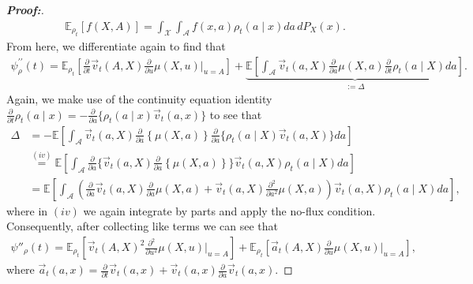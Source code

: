\documentclass[11pt,twoside]{article}
\theoremstyle{definition}
\theoremstyle{remark}
\begin{document}
\begin{proof}[\textbf{Proof:}]
    \begin{align*}
        \mathbb{E}_{\rho_t}[f(X, A)] = \int_{\mathcal{X}}\int_{\mathcal{A}} f(x, a)\rho_t(a\mid x) da\,dP_X(x).
    \end{align*}
    From here, we differentiate again to find that
    \begin{align*}
        \psi^{\prime \prime}_\rho(t) = \mathbb{E}_{\rho_t}\! \left[ \frac{\partial}{\partial t} \vec{v}_t(A, X)  \frac{\partial}{\partial u}  \mu(X, u) \Big|_{u = A} \right] + \underbrace{\mathbb{E}\! \left[\int_{\mathcal{A}} \vec{v}_t(a, X) \frac{\partial}{\partial a}  \mu(X, a) \frac{\partial}{\partial t}\rho_t(a \! \mid \! X) da  \right]}_{:= \Delta }.
    \end{align*}
    Again, we make use of the continuity equation identity $\frac{\partial}{\partial t} \rho_t(a \! \mid \! x) = - \frac{\partial}{\partial a}\{ \rho_t(a \! \mid \! x) \vec{v}_t(a, x) \}$ to see that
    \begin{align*}
         \Delta &= - \mathbb{E}\! \left[\int_{\mathcal{A}} \vec{v}_t(a, X) \frac{\partial}{\partial a} \left\{ \mu(X, a) \right\} \frac{\partial}{\partial a}\{ \rho_t(a \! \mid \! X) \vec{v}_t(a, X) \}  da  \right] \\
         &\overset{(iv)}{=} \mathbb{E} \! \left[ \int_{\mathcal{A}} \frac{\partial}{\partial a}\{ \vec{v}_t(a, X) \frac{\partial}{\partial a} \left\{ \mu(X, a) \right\}  \} \vec{v}_t(a, X) \rho_t(a \! \mid \! X) da \right] \\
         &= \mathbb{E} \! \left[ \int_{\mathcal{A}} \left(\frac{\partial}{\partial a}\vec{v}_t(a,X) \frac{\partial}{\partial a}\mu(X,a) +\vec{v}_t(a,X) \frac{\partial^2}{\partial a^2}\mu(X,a) \right) \vec{v}_t(a, X) \rho_t(a \! \mid \! X) da \right],
    \end{align*}
    where in $(iv)$ we again integrate by parts and apply the no-flux condition. Consequently, after collecting like terms we can see that
    \begin{align*}
    \psi''_\rho(t) = \mathbb{E}_{\rho_t} \! \left[ \vec{v}_t(A, X)^2 \frac{\partial^2 }{\partial u^2} \mu(X, u) \Big|_{u = A} \right] + \mathbb{E}_{\rho_t} \!\left[ \vec{a}_t(A, X) \frac{\partial }{\partial u} \mu(X, u) \Big|_{u = A} \right],
\end{align*}
where $\vec{a}_t(a, x) = \frac{\partial}{\partial t} \vec{v}_t(a, x) + \vec{v}_t(a, x) \frac{\partial}{\partial a} \vec{v}_t(a, x)$.

     
\end{proof}
\end{document}
